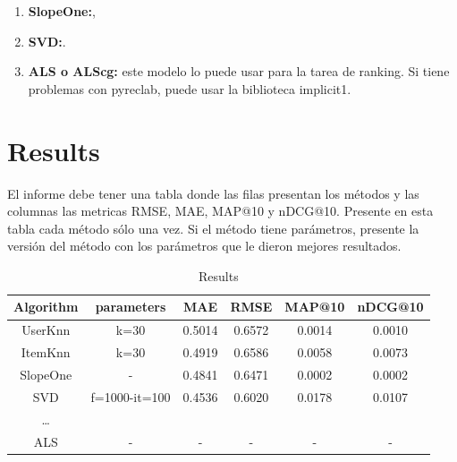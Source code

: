 \documentclass[letterpaper, 10 pt, conference]{ieeeconf}  %
\begin{document}
\begin{enumerate}
    \item \textbf{SlopeOne:},
    \item \textbf{SVD:}.
    \item \textbf{ALS o ALScg:} este modelo lo puede usar para la tarea de ranking. Si tiene problemas con pyreclab, puede usar la biblioteca implicit1.
\end{enumerate}


\section{Results}

El informe debe tener una tabla donde las filas presentan
los métodos y las columnas las metricas RMSE, MAE, MAP@10 y nDCG@10. Presente en esta tabla cada método sólo una vez. Si el método tiene parámetros, presente la versión del método con los parámetros que le dieron mejores resultados.

\begin{table}[]
\centering
\begin{tabular}{|c|c|c|c|c|c|}
\hline 
\rowcolor[HTML]{DAE8FC} 
Algorithm & parameters & MAE & RMSE & MAP@10 & nDCG@10   \\ \hline \hline
UserKnn   & k=30  &  0.5014 &  0.6572   & 0.0014 & 0.0010 \\ \hline
ItemKnn   & k=30  &  0.4919 &  0.6586 &  0.0058 & 0.0073  \\ \hline
SlopeOne   & -  &   0.4841 &  0.6471   &   0.0002   &  0.0002 \\ \hline

SVD   & f=1000-it=100  & 0.4536 &  0.6020   &   0.0178   & 0.0107  \\ \hline
\dots       &        &         &        &          &            \\ \hline
ALS   & -   & -     & -    &    -   & - \\ \hline

\end{tabular}
\caption{Results}
\label{raw-data}
\end{table}
\end{document}
